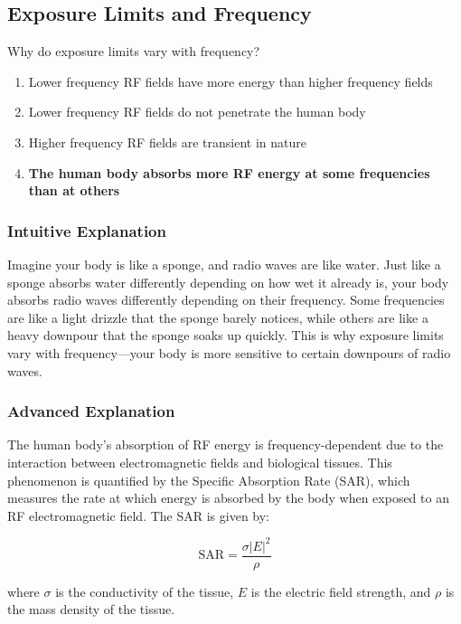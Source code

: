 \subsection{Exposure Limits and Frequency}
\label{T0C05}

\begin{tcolorbox}[colback=gray!10!white,colframe=black!75!black,title=T0C05]
Why do exposure limits vary with frequency?
\begin{enumerate}[label=\Alph*)]
    \item Lower frequency RF fields have more energy than higher frequency fields
    \item Lower frequency RF fields do not penetrate the human body
    \item Higher frequency RF fields are transient in nature
    \item \textbf{The human body absorbs more RF energy at some frequencies than at others}
\end{enumerate}
\end{tcolorbox}

\subsubsection{Intuitive Explanation}
Imagine your body is like a sponge, and radio waves are like water. Just like a sponge absorbs water differently depending on how wet it already is, your body absorbs radio waves differently depending on their frequency. Some frequencies are like a light drizzle that the sponge barely notices, while others are like a heavy downpour that the sponge soaks up quickly. This is why exposure limits vary with frequency—your body is more sensitive to certain downpours of radio waves.

\subsubsection{Advanced Explanation}
The human body's absorption of RF energy is frequency-dependent due to the interaction between electromagnetic fields and biological tissues. This phenomenon is quantified by the Specific Absorption Rate (SAR), which measures the rate at which energy is absorbed by the body when exposed to an RF electromagnetic field. The SAR is given by:

\[
\text{SAR} = \frac{\sigma |E|^2}{\rho}
\]

where \(\sigma\) is the conductivity of the tissue, \(E\) is the electric field strength, and \(\rho\) is the mass density of the tissue.

